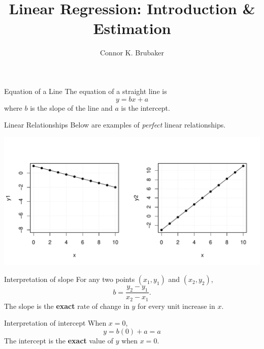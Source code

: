 \documentclass[handout]{beamer}
\title{Linear Regression: Introduction \& Estimation}
\author{Connor K. Brubaker}
\institute{
Department of Statistics \\
Texas A\&M University
}
\date{}
\begin{document}
\maketitle

\begin{frame}{Equation of a Line}
    The equation of a straight line is 
    \begin{equation*}
        y = bx + a
    \end{equation*}
    where $b$ is the slope of the line and $a$ is the intercept.
\end{frame}

\begin{frame}{Linear Relationships}
    Below are examples of \textit{perfect} linear relationships.
    \begin{center}
        \includegraphics[width=\linewidth]{figures/perfect_linear.pdf}
    \end{center}
\end{frame}

\begin{frame}{Interpretation of slope}
    For any two points $(x_1, y_1)$ and $(x_2, y_2)$,
    \begin{equation*}
        b = \frac{y_2 - y_1}{x_2 - x_1}.
    \end{equation*}
    The slope is the \textbf{exact} rate of change in $y$ for every unit increase in $x$.
\end{frame}

\begin{frame}{Interpretation of intercept}
    When $x = 0$,
    \begin{equation*}
        y = b(0) + a = a
    \end{equation*}
    The intercept is the \textbf{exact} value of $y$ when $x = 0$. 
\end{frame}
\end{document}
